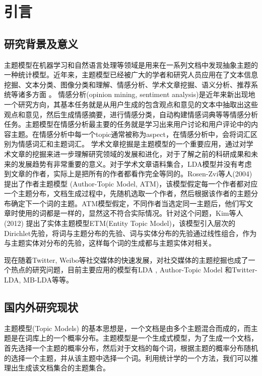\chapter{引言}

\section{研究背景及意义}
主题模型在机器学习和自然语言处理等领域是用来在一系列文档中发现抽象主题的一种统计模型。近年来，主题模型已经被广大的学者和研究人员应用在了文本信息挖掘、文本分类、图像分类和理解、情感分析、学术文章挖掘、语义分析、推荐系统等诸多方面 \cite{leskovec2009meme, wang2012tm, 008:labeledlda, 2011:xuge, 011:mblda}。
情感分析(opinion mining,  sentiment analysis)是近年来新出现地一个研究方向，其基本任务就是从用户生成的包含观点和意见的文本中抽取出这些观点和意见，然后生成情感摘要，进行情感分类，自动构建情感词典等等情感分析任务。主题模型在情感分析最主要的任务就是学习出来用户讨论和用户评论中的内容主题。在情感分析中每一个topic通常被称为aspect，在情感分析中，会将词汇区别为情感词汇和主题词汇。
学术文章挖掘是主题模型的一个重要应用，通过对学术文章的挖掘来进一步理解研究领域的发展和进化，对于了解之前的科研成果和未来的发展趋势有非常重要的意义。对于学术文章语料集合，LDA模型并没有考虑到文章的作者，实际上是把所有的作者都看作完全等同的。Rosen-Zvi等人(2004) \cite{rosen2004author} 提出了作者主题模型 (Author-Topic Model, ATM)，该模型假定每一个作者都对应一个主题分布，文档生成过程中，先随机选取一个作者，然后根据该作者的主题分布确定下一个词的主题。ATM模型假定，不同作者当选定同一主题后，他们写文章时使用的词都是一样的，显然这不符合实际情况。针对这个问题，Kim等人(2012) \cite{Kim:2012} 提出了实体主题模型ETM(Entity Topic Model)，该模型引入层次的Dirichlet先验，将词与主题分布的先验、词与实体分布的先验通过线性组合，作为与主题实体对分布的先验，这样每个词的生成都与主题实体对相关。

现在随着Twitter, Weibo等社交媒体的快速发展，对社交媒体的主题挖掘也成了一个热点的研究问题，目前主要应用的模型有LDA \cite{Blei:2003}, Author-Topic Model\cite{rosen2004author} 和Twitter-LDA\cite{zhao2011comparing}, MB-LDA\cite{011:mblda}等等。

\section{国内外研究现状}
主题模型(Topic Models) \cite{steyvers2007probabilistic} 的基本思想是，一个文档是由多个主题混合而成的，而主题是在词库上的一个概率分布。主题模型是一个生成式模型，为了生成一个文档，首先选择一个主题的概率分布，然后对于文档的每个词，根据主题的概率分布随机的选择一个主题，并从该主题中选择一个词。利用统计学的一个方法，我们可以推理出生成该文档集合的主题集合。


